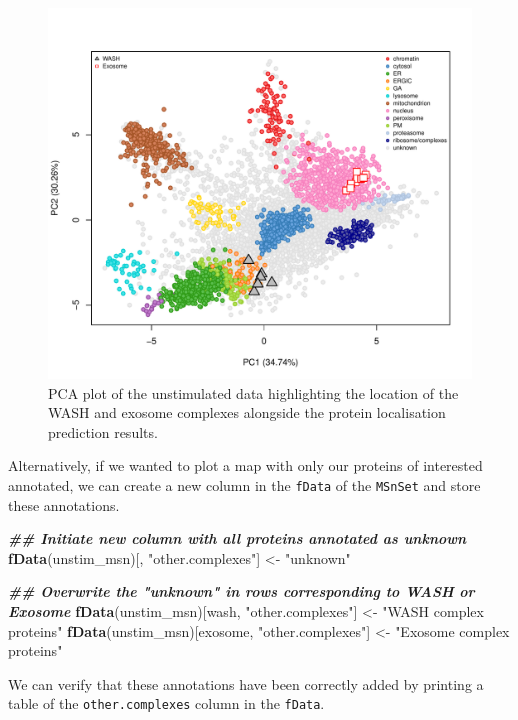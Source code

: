 \documentclass[9pt,a4paper,]{extarticle}
\newenvironment{Shaded}{\begin{snugshade}}{\end{snugshade}}
\newcommand{\DocumentationTok}[1]{\textcolor[rgb]{0.56,0.35,0.01}{\textbf{\textit{#1}}}}
\newcommand{\FunctionTok}[1]{\textcolor[rgb]{0.13,0.29,0.53}{\textbf{#1}}}
\newcommand{\NormalTok}[1]{#1}
\newcommand{\OtherTok}[1]{\textcolor[rgb]{0.56,0.35,0.01}{#1}}
\newcommand{\StringTok}[1]{\textcolor[rgb]{0.31,0.60,0.02}{#1}}
\begin{document}
\begin{figure}[H]

{\centering \includegraphics[width=0.7\linewidth,]{figs/annotated_pca} 

}

\caption{PCA plot of the unstimulated data highlighting the location of the WASH and exosome complexes alongside the protein localisation prediction results.}\label{fig:fig-pca-highlighted}
\end{figure}

Alternatively, if we wanted to plot a map with only our proteins of interested
annotated, we can create a new column in the \texttt{fData} of the \texttt{MSnSet} and store
these annotations.

\begin{Shaded}
\begin{Highlighting}[]
\DocumentationTok{\#\# Initiate new column with all proteins annotated as unknown}
\FunctionTok{fData}\NormalTok{(unstim\_msn)[, }\StringTok{"other.complexes"}\NormalTok{] }\OtherTok{\textless{}{-}} \StringTok{"unknown"}

\DocumentationTok{\#\# Overwrite the "unknown" in rows corresponding to WASH or Exosome}
\FunctionTok{fData}\NormalTok{(unstim\_msn)[wash, }\StringTok{"other.complexes"}\NormalTok{] }\OtherTok{\textless{}{-}} \StringTok{"WASH complex proteins"}
\FunctionTok{fData}\NormalTok{(unstim\_msn)[exosome, }\StringTok{"other.complexes"}\NormalTok{] }\OtherTok{\textless{}{-}} \StringTok{"Exosome complex proteins"}
\end{Highlighting}
\end{Shaded}

We can verify that these annotations have been correctly added by printing a
table of the \texttt{other.complexes} column in the \texttt{fData}.
\end{document}
